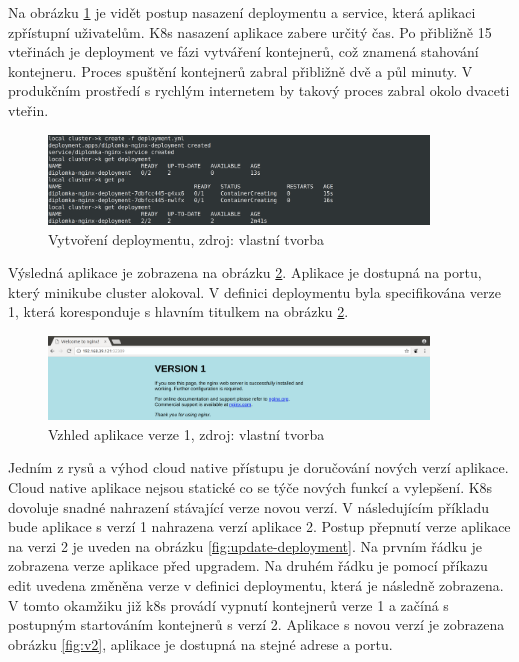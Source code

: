 Na obrázku \ref{fig:create-deployment} je vidět postup nasazení deploymentu a service, která aplikaci zpřístupní uživatelům. K8s nasazení aplikace zabere určitý čas. Po přibližně 15 vteřinách je deployment ve fázi vytváření kontejnerů, což znamená stahování kontejneru. Proces spuštění kontejnerů zabral přibližně dvě a půl minuty. V produkčním prostředí s rychlým internetem by takový proces zabral okolo dvaceti vteřin. 


\begin{figure}[H]
  \begin{centering}
    
	  \includegraphics[width=0.9\textwidth]{images/create-deployment.png}
    \par
	  \caption{Vytvoření deploymentu\label{fig:create-deployment}, zdroj: vlastní tvorba}
    \end{centering}
\end{figure}

Výsledná aplikace je zobrazena na obrázku \ref{fig:v1}. Aplikace je dostupná na portu, který minikube cluster alokoval. V definici deploymentu byla specifikována verze 1, která koresponduje s hlavním titulkem na obrázku \ref{fig:v1}.

\begin{figure}[H]
  \begin{centering}
    
	  \includegraphics[width=0.9\textwidth]{images/v1.png}
    \par
	  \caption{Vzhled aplikace verze 1\label{fig:v1}, zdroj: vlastní tvorba}
    \end{centering}
\end{figure}

Jedním z rysů a výhod cloud native přístupu je doručování nových verzí aplikace. Cloud native aplikace nejsou statické co se týče nových funkcí a vylepšení. K8s dovoluje snadné nahrazení stávající verze novou verzí. V následujícím příkladu bude aplikace s verzí 1 nahrazena verzí aplikace 2. Postup přepnutí verze aplikace na verzi 2 je uveden na obrázku \ref{fig:update-deployment}. Na prvním řádku je zobrazena verze aplikace před upgradem. Na druhém řádku je pomocí příkazu edit uvedena změněna verze v definici deploymentu, která je následně zobrazena. V tomto okamžiku již k8s provádí vypnutí kontejnerů verze 1 a začíná s postupným startováním kontejnerů s verzí 2. Aplikace s novou verzí je zobrazena obrázku \ref{fig:v2}, aplikace je dostupná na stejné adrese a portu.

